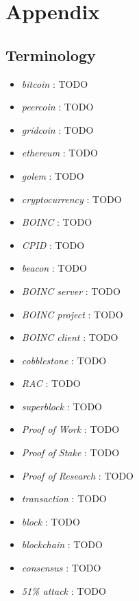 \section{Appendix}

\subsection{Terminology}

\begin{itemize}
  \item \textit{bitcoin} : TODO
  \item \textit{peercoin} : TODO
  \item \textit{gridcoin} : TODO
  \item \textit{ethereum} : TODO
  \item \textit{golem} : TODO
  \item \textit{cryptocurrency} : TODO
  \item \textit{BOINC} : TODO
  \item \textit{CPID} : TODO
  \item \textit{beacon} : TODO
  \item \textit{BOINC server} : TODO
  \item \textit{BOINC project} : TODO
  \item \textit{BOINC client} : TODO
  \item \textit{cobblestone} : TODO
  \item \textit{RAC} : TODO
  \item \textit{superblock} : TODO
  \item \textit{Proof of Work} : TODO
  \item \textit{Proof of Stake} : TODO
  \item \textit{Proof of Research} : TODO
  \item \textit{transaction} : TODO
  \item \textit{block} : TODO
  \item \textit{blockchain} : TODO
  \item \textit{consensus} : TODO
  \item \textit{51\% attack} : TODO
  
\end{itemize}
